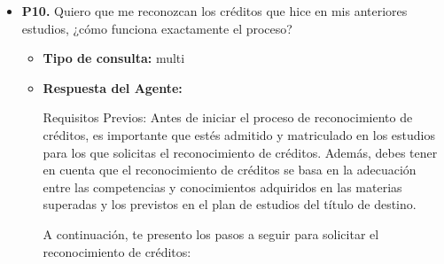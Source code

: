 \documentclass{article}
\begin{document}
\begin{itemize}
\begin{itemize}
                        Recuerda que es importante seguir las instrucciones y requisitos establecidos en la \textbf{Guía completa de liquidación de viajes} y en la \textbf{Miniguía para viajes por razón del servicio} para asegurarte de que el trámite se realice de manera correcta y eficiente.
                  \item \textbf{Contexto utilizado:}

            \end{itemize}

      \item \textbf{P10.} Quiero que me reconozcan los créditos que hice en mis anteriores estudios, ¿cómo funciona exactamente el proceso? \\
            \begin{itemize}
                  \item \textbf{Tipo de consulta:} multi
                  \item \textbf{Respuesta del Agente:}

                        Requisitos Previos:
                        Antes de iniciar el proceso de reconocimiento de créditos, es importante que estés admitido y matriculado en los estudios para los que solicitas el reconocimiento de créditos. Además, debes tener en cuenta que el reconocimiento de créditos se basa en la adecuación entre las competencias y conocimientos adquiridos en las materias superadas y los previstos en el plan de estudios del título de destino.

                        A continuación, te presento los pasos a seguir para solicitar el reconocimiento de créditos:


\end{itemize}
\end{itemize}
\end{document}
